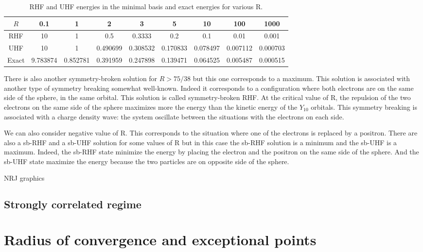 \documentclass[11pt,a4paper]{article}
\begin{document}
{\begin{table}[h!]
\centering
\begin{tabular}{c c c c c c c c c}
$R$ & 0.1 & 1 & 2 & 3 & 5 & 10 & 100 & 1000 \\
\hline
RHF & 10 & 1 & 0.5 & 0.3333 & 0.2 & 0.1 & 0.01 & 0.001 \\
\hline
UHF & 10 & 1 & 0.490699 & 0.308532 & 0.170833 & 0.078497 & 0.007112 & 0.000703 \\
\hline
Exact & 9.783874 & 0.852781 & 0.391959 & 0.247898 & 0.139471 & 0.064525 & 0.005487 & 0.000515 \\
\end{tabular}
    \caption{\centering RHF and UHF energies in the minimal basis and exact energies for various R.}
\label{tab:ERHFvsEUHF}
\end{table}

There is also another symmetry-broken solution for $R>75/38$ but this one corresponds to a maximum. This solution is associated with another type of symmetry breaking somewhat well-known. Indeed it corresponds to a configuration where both electrons are on the same side of the sphere, in the same orbital. This solution is called symmetry-broken RHF. At the critical value of R, the repulsion of the two electrons on the same side of the sphere maximizes more the energy than the kinetic energy of the $Y_{10}$ orbitals. This symmetry breaking is associated with a charge density wave: the system oscillate between the situations with the electrons on each side.

We can also consider negative value of R. This corresponds to the situation where one of the electrons is replaced by a positron. There are also a sb-RHF and a sb-UHF solution for some values of R but in this case the sb-RHF solution is a minimum and the sb-UHF is a maximum. Indeed, the sb-RHF state minimize the energy by placing the electron and the positron on the same side of the sphere. And the sb-UHF state maximize the energy because the two particles are on opposite side of the sphere.

NRJ graphics

\subsection{Strongly correlated regime}

\section{Radius of convergence and exceptional points}

}
\end{document}
